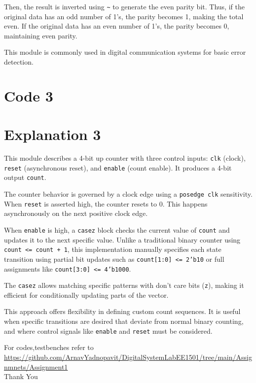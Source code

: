 \documentclass{article}
\begin{document}
Then, the result is inverted using \texttt{\~{}} to generate the even parity bit. Thus, if the original data has an odd number of 1's, the parity becomes 1, making the total even. If the original data has an even number of 1's, the parity becomes 0, maintaining even parity.

This module is commonly used in digital communication systems for basic error detection.

\section*{Code 3}


\section*{Explanation 3}
This module describes a 4-bit up counter with three control inputs: \texttt{clk} (clock), \texttt{reset} (asynchronous reset), and \texttt{enable} (count enable). It produces a 4-bit output \texttt{count}.

The counter behavior is governed by a clock edge using a \texttt{posedge clk} sensitivity. When \texttt{reset} is asserted high, the counter resets to 0. This happens asynchronously on the next positive clock edge.

When \texttt{enable} is high, a \texttt{casez} block checks the current value of \texttt{count} and updates it to the next specific value. Unlike a traditional binary counter using \texttt{count <= count + 1}, this implementation manually specifies each state transition using partial bit updates such as \texttt{count[1:0] <= 2'b10} or full assignments like \texttt{count[3:0] <= 4'b1000}.

The \texttt{casez} allows matching specific patterns with don’t care bits (\texttt{z}), making it efficient for conditionally updating parts of the vector.

This approach offers flexibility in defining custom count sequences. It is useful when specific transitions are desired that deviate from normal binary counting, and where control signals like \texttt{enable} and \texttt{reset} must be considered.

For codes,testbenches refer to \\
\url{https://github.com/ArnavYadnopavit/DigitalSystemLabEE1501/tree/main/Assignmnets/Assignment1}
\\

\centering
Thank You
\end{document}

